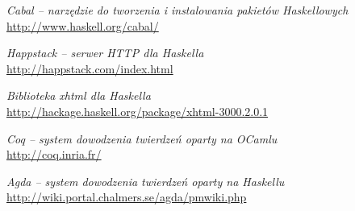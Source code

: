 \documentclass[10pt,leqno]{article}
\begin{document}
\begin{thebibliography}{9}
  \emph{Cabal -- narzędzie do tworzenia i instalowania pakietów Haskellowych} \\
  \url{http://www.haskell.org/cabal/}

  \emph{Happstack -- serwer HTTP dla Haskella} \\
  \url{http://happstack.com/index.html}

  \emph{Biblioteka xhtml dla Haskella} \\
  \url{http://hackage.haskell.org/package/xhtml-3000.2.0.1}

  \emph{Coq -- system dowodzenia twierdzeń oparty na OCamlu} \\
  \url{http://coq.inria.fr/}

  \emph{Agda -- system dowodzenia twierdzeń oparty na Haskellu} \\
  \url{http://wiki.portal.chalmers.se/agda/pmwiki.php}

\end{thebibliography}
\end{document}
